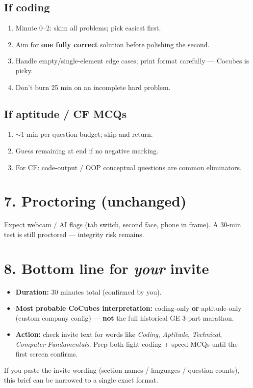\documentclass[a4paper,10pt]{article}
\begin{document}
\subsection{If coding}
\begin{enumerate}
  \item Minute 0--2: skim all problems; pick easiest first.
  \item Aim for \textbf{one fully correct} solution before polishing the second.
  \item Handle empty/single-element edge cases; print format carefully --- Cocubes is picky.
  \item Don't burn 25 min on an incomplete hard problem.
\end{enumerate}
\subsection{If aptitude / CF MCQs}
\begin{enumerate}
  \item $\sim$1 min per question budget; skip and return.
  \item Guess remaining at end if no negative marking.
  \item For CF: code-output / OOP conceptual questions are common eliminators.
\end{enumerate}

\section{7. Proctoring (unchanged)}
Expect webcam / AI flags (tab switch, second face, phone in frame). A 30-min test is still proctored --- integrity risk remains.

\section{8. Bottom line for \emph{your} invite}
\begin{itemize}
  \item \textbf{Duration:} 30 minutes total (confirmed by you).
  \item \textbf{Most probable CoCubes interpretation:} coding-only \textbf{or} aptitude-only (custom company config) --- \textbf{not} the full historical GE 3-part marathon.
  \item \textbf{Action:} check invite text for words like \textit{Coding}, \textit{Aptitude}, \textit{Technical}, \textit{Computer Fundamentals}. Prep both light coding + speed MCQs until the first screen confirms.
\end{itemize}

\vspace{2mm}
{\small\color{muted}If you paste the invite wording (section names / languages / question counts), this brief can be narrowed to a single exact format.}
\end{document}
